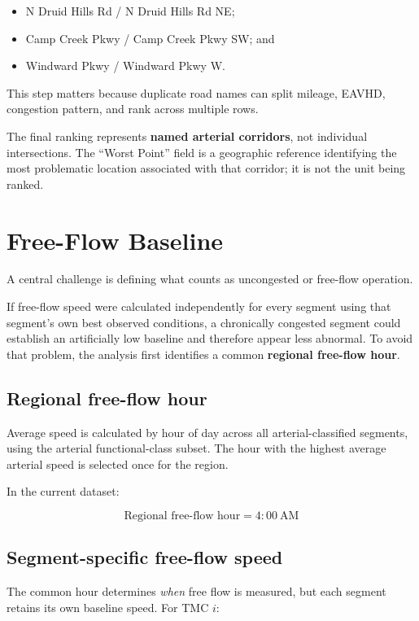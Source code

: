 \documentclass[11pt]{article}
\begin{document}
\begin{itemize}
    \item N Druid Hills Rd / N Druid Hills Rd NE;
    \item Camp Creek Pkwy / Camp Creek Pkwy SW; and
    \item Windward Pkwy / Windward Pkwy W.
\end{itemize}

This step matters because duplicate road names can split mileage, EAVHD, congestion pattern, and rank across multiple rows.

The final ranking represents \textbf{named arterial corridors}, not individual intersections. The ``Worst Point'' field is a geographic reference identifying the most problematic location associated with that corridor; it is not the unit being ranked.

\section{Free-Flow Baseline}

A central challenge is defining what counts as uncongested or free-flow operation.

If free-flow speed were calculated independently for every segment using that segment's own best observed conditions, a chronically congested segment could establish an artificially low baseline and therefore appear less abnormal. To avoid that problem, the analysis first identifies a common \textbf{regional free-flow hour}.

\subsection{Regional free-flow hour}

Average speed is calculated by hour of day across all arterial-classified segments, using the arterial functional-class subset. The hour with the highest average arterial speed is selected once for the region.

In the current dataset:

\[
\boxed{\text{Regional free-flow hour} = 4{:}00\ \mathrm{AM}}
\]

\subsection{Segment-specific free-flow speed}

The common hour determines \emph{when} free flow is measured, but each segment retains its own baseline speed. For TMC $i$:
\end{document}
